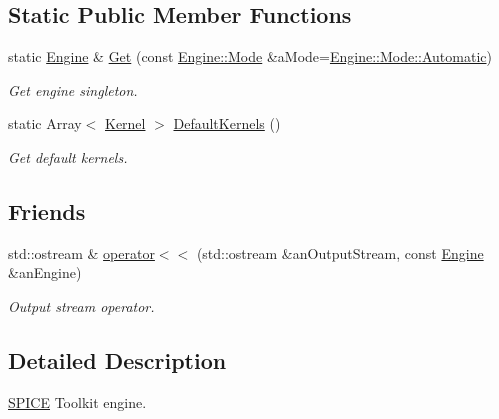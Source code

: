 \subsection*{Static Public Member Functions}
\begin{DoxyCompactItemize}
\item 
static \hyperlink{classlibrary_1_1physics_1_1env_1_1ephem_1_1spice_1_1_engine}{Engine} \& \hyperlink{classlibrary_1_1physics_1_1env_1_1ephem_1_1spice_1_1_engine_ae5def9d4300f0673b2bc73f0703afeb1}{Get} (const \hyperlink{classlibrary_1_1physics_1_1env_1_1ephem_1_1spice_1_1_engine_a2d185a63bce354bff9ad38810410eab4}{Engine\+::\+Mode} \&a\+Mode=\hyperlink{classlibrary_1_1physics_1_1env_1_1ephem_1_1spice_1_1_engine_a2d185a63bce354bff9ad38810410eab4a086247a9b57fde6eefee2a0c4752242d}{Engine\+::\+Mode\+::\+Automatic})
\begin{DoxyCompactList}\small\item\em Get engine singleton. \end{DoxyCompactList}\item 
static Array$<$ \hyperlink{classlibrary_1_1physics_1_1env_1_1ephem_1_1spice_1_1_kernel}{Kernel} $>$ \hyperlink{classlibrary_1_1physics_1_1env_1_1ephem_1_1spice_1_1_engine_a5963ba07fc5c8c58b439964a5666b527}{Default\+Kernels} ()
\begin{DoxyCompactList}\small\item\em Get default kernels. \end{DoxyCompactList}\end{DoxyCompactItemize}
\subsection*{Friends}
\begin{DoxyCompactItemize}
\item 
std\+::ostream \& \hyperlink{classlibrary_1_1physics_1_1env_1_1ephem_1_1spice_1_1_engine_a880dd680a3b5444757480fafd1a52679}{operator$<$$<$} (std\+::ostream \&an\+Output\+Stream, const \hyperlink{classlibrary_1_1physics_1_1env_1_1ephem_1_1spice_1_1_engine}{Engine} \&an\+Engine)
\begin{DoxyCompactList}\small\item\em Output stream operator. \end{DoxyCompactList}\end{DoxyCompactItemize}


\subsection{Detailed Description}
\hyperlink{classlibrary_1_1physics_1_1env_1_1ephem_1_1_s_p_i_c_e}{S\+P\+I\+CE} Toolkit engine. 

